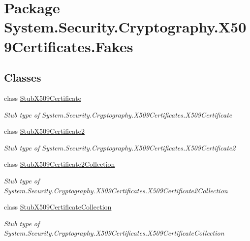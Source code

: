 \hypertarget{namespace_system_1_1_security_1_1_cryptography_1_1_x509_certificates_1_1_fakes}{\section{Package System.\-Security.\-Cryptography.\-X509\-Certificates.\-Fakes}
\label{namespace_system_1_1_security_1_1_cryptography_1_1_x509_certificates_1_1_fakes}
}
\subsection*{Classes}
\begin{DoxyCompactItemize}
\item 
class \hyperlink{class_system_1_1_security_1_1_cryptography_1_1_x509_certificates_1_1_fakes_1_1_stub_x509_certificate}{Stub\-X509\-Certificate}
\begin{DoxyCompactList}\small\item\em Stub type of System.\-Security.\-Cryptography.\-X509\-Certificates.\-X509\-Certificate\end{DoxyCompactList}\item 
class \hyperlink{class_system_1_1_security_1_1_cryptography_1_1_x509_certificates_1_1_fakes_1_1_stub_x509_certificate2}{Stub\-X509\-Certificate2}
\begin{DoxyCompactList}\small\item\em Stub type of System.\-Security.\-Cryptography.\-X509\-Certificates.\-X509\-Certificate2\end{DoxyCompactList}\item 
class \hyperlink{class_system_1_1_security_1_1_cryptography_1_1_x509_certificates_1_1_fakes_1_1_stub_x509_certificate2_collection}{Stub\-X509\-Certificate2\-Collection}
\begin{DoxyCompactList}\small\item\em Stub type of System.\-Security.\-Cryptography.\-X509\-Certificates.\-X509\-Certificate2\-Collection\end{DoxyCompactList}\item 
class \hyperlink{class_system_1_1_security_1_1_cryptography_1_1_x509_certificates_1_1_fakes_1_1_stub_x509_certificate_collection}{Stub\-X509\-Certificate\-Collection}
\begin{DoxyCompactList}\small\item\em Stub type of System.\-Security.\-Cryptography.\-X509\-Certificates.\-X509\-Certificate\-Collection\end{DoxyCompactList}\item 

\end{DoxyCompactItemize}
